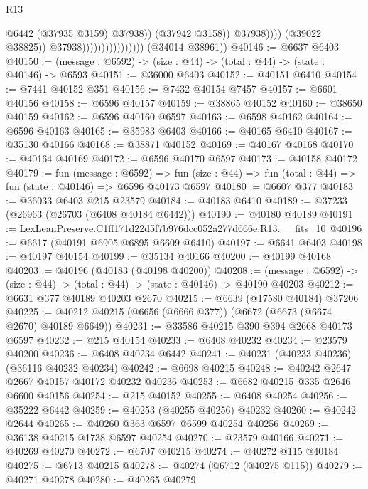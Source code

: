 \begin{lexlean}{R13}
\begin{coremodule}
                                                      @6442
                                                      (@37935 @3159)
                                                      @37938))
                                                  (@37942 @3158))
                                                @37938))))
                                        (@39022 @38825))
                                      @37938))))))))))))))))
      (@34014 @38961))
@40146 := @6637 @6403
@40150 := (message : @6592) -> (size : @44) -> (total : @44) -> (state : @40146) -> @6593
@40151 := @36000 @6403
@40152 := @40151 @6410
@40154 := @7441 @40152 @351
@40156 := @7432 @40154 @7457
@40157 := @6601 @40156
@40158 := @6596 @40157
@40159 := @38865 @40152
@40160 := @38650 @40159
@40162 := @6596 @40160 @6597
@40163 := @6598 @40162
@40164 := @6596 @40163
@40165 := @35983 @6403
@40166 := @40165 @6410
@40167 := @35130 @40166
@40168 := @38871 @40152
@40169 := @40167 @40168
@40170 := @40164 @40169
@40172 := @6596 @40170 @6597
@40173 := @40158 @40172
@40179 := fun (message : @6592) =>
  fun (size : @44) => fun (total : @44) => fun (state : @40146) => @6596 @40173 @6597
@40180 := @6607 @377
@40183 := @36033 @6403 @215 @23579
@40184 := @40183 @6410
@40189 := @37233 (@26963 (@26703 (@6408 @40184 @6442)))
@40190 := @40180 @40189
@40191 := LexLeanPreserve.C1ff171d22d5f7b976dcc052a277d666e.R13.__fits_10
@40196 := @6617 (@40191 @6905 @6895 @6609 @6410)
@40197 := @6641 @6403
@40198 := @40197 @40154
@40199 := @35134 @40166
@40200 := @40199 @40168
@40203 := @40196 (@40183 (@40198 @40200))
@40208 := (message : @6592) -> (size : @44) -> (total : @44) -> (state : @40146) -> @40190 @40203
@40212 := @6631 @377 @40189 @40203 @2670
@40215 := @6639 (@17580 @40184) @37206
@40225 := @40212 @40215 (@6656 (@6666 @377)) (@6672 (@6673 (@6674 @2670) @40189 @6649))
@40231 := @33586 @40215 @390 @394 @2668 @40173 @6597
@40232 := @215 @40154
@40233 := @6408 @40232
@40234 := @23579 @40200
@40236 := @6408 @40234 @6442
@40241 := @40231 (@40233 @40236) (@36116 @40232 @40234)
@40242 := @6698 @40215
@40248 := @40242 @2647 @2667 @40157 @40172 @40232 @40236
@40253 := @6682 @40215 @335 @2646 @6600 @40156
@40254 := @215 @40152
@40255 := @6408 @40254
@40256 := @35222 @6442
@40259 := @40253 (@40255 @40256) @40232
@40260 := @40242 @2644
@40265 := @40260 @363 @6597 @6599 @40254 @40256
@40269 := @36138 @40215 @1738 @6597 @40254
@40270 := @23579 @40166
@40271 := @40269 @40270
@40272 := @6707 @40215
@40274 := @40272 @115 @40184
@40275 := @6713 @40215
@40278 := @40274 (@6712 (@40275 @115))
@40279 := @40271 @40278
@40280 := @40265 @40279

\end{coremodule}
\end{lexlean}
